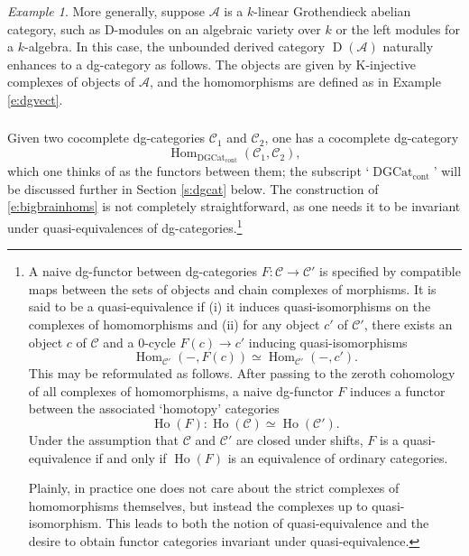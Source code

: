 \documentclass[10pt]{amsart}
\newcommand{\udHom}{\on{Hom}_{\DGCat}}
\newcommand{\on}{\operatorname}
\theoremstyle{remark}
\newtheorem{ex}[subsubsection]{Example}
\newcommand{\sA}{\mathscr{A}}
\newcommand{\Hom}{\operatorname{Hom}}
\numberwithin{equation}{section}
\newcommand{\sC}{\mathscr{C}}
\newcommand{\msf}{\operatorname}
\newcommand{\DGCat}{\msf{DGCat}_{\on{cont}}}
\begin{document}
\begin{ex}More generally, suppose $\sA$ is a $k$-linear Grothendieck abelian 
category, such as D-modules 
on an algebraic variety over $k$ or the left modules for a $k$-algebra. In this case, the 
unbounded derived category 
%
$
    \on{D}(\sA)
$
%	
naturally enhances to a dg-category as follows. The objects are given by 
K-injective complexes of objects of $\sA$, and the homomorphisms are defined  
as in Example \ref{e:dgvect}.
	
	
\end{ex}


\subsubsection{}\label{s:homdgcats} Given two cocomplete dg-categories $\sC_1$ 
and $\sC_2$, one 
has a cocomplete dg-category 
%
\begin{equation} \label{e:bigbrainhoms}
\udHom(\sC_1, \sC_2),
\end{equation}
%
which one thinks of as the functors between them; the subscript `$\DGCat$' will be discussed further in Section \ref{s:dgcat} below. The construction of \eqref{e:bigbrainhoms} is not 
completely straightforward, as one needs it to be invariant under 
quasi-equivalences of dg-categories.\footnote{A naive dg-functor between 
dg-categories $F: \sC \rightarrow \sC'$ is specified by compatible maps between 
the sets of objects and chain complexes of morphisms. It is said to be a 
quasi-equivalence if (i) it induces quasi-isomorphisms on the complexes of 
homomorphisms and (ii) for any object $c'$ of $\sC'$, there exists an object $c$ of 
$\sC$ and a 0-cycle $F(c) \rightarrow  c'$ inducing quasi-isomorphisms 
%
\begin{equation} \label{e:bigbrainboms}
  \Hom_{\sC'}(-, F(c)) \simeq \Hom_{\sC'}(-, c'). 
\end{equation}
%
This may be reformulated as follows. After passing to the zeroth cohomology of all complexes of 
homomorphisms, a naive dg-functor $F$ induces a functor between the associated `homotopy' categories
%
\[
\on{Ho}(F): \on{Ho}(\sC) \simeq \on{Ho}(\sC'). 
\]
% 
Under the assumption that $\sC$ and $\sC'$ are closed under shifts, $F$ is a quasi-equivalence if and only if $\on{Ho}(F)$ is an equivalence of ordinary categories. 

Plainly, in practice one does not care about the strict complexes of homomorphisms themselves, but instead the complexes up to quasi-isomorphism. This leads to both the notion of quasi-equivalence and the desire to obtain functor categories invariant under quasi-equivalence. 
}
\end{document}
